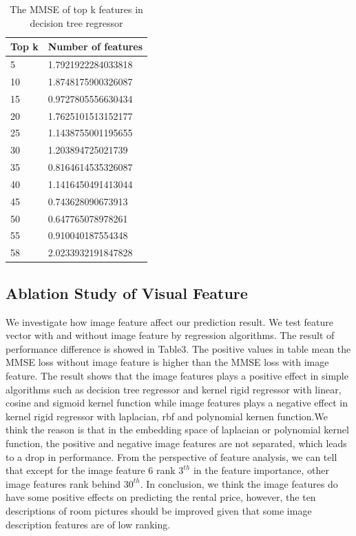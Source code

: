 \documentclass[final]{cvpr}
\begin{document}
\begin{table}[]
\centering
\begin{tabular}{|l|l|}
\hline
Top k & Number of features \\ \hline
5     & 1.7921922284033818 \\ \hline
10    & 1.8748175900326087 \\ \hline
15    & 0.9727805556630434 \\ \hline
20    & 1.7625101513152177 \\ \hline
25    & 1.1438755001195655 \\ \hline
30    & 1.203894725021739  \\ \hline
35    & 0.8164614535326087 \\ \hline
40    & 1.1416450491413044 \\ \hline
45    & 0.743628090673913  \\ \hline
50    & 0.647765078978261  \\ \hline
55    & 0.910040187554348  \\ \hline
58    & 2.0233932191847828 \\ \hline
\end{tabular}
\caption{The MMSE of top k features in decision tree regressor}
\label{tab:my-table21}
\end{table}



\subsection{Ablation Study of Visual Feature}
We investigate how image feature affect our prediction result. We test feature vector with and without image feature by regression algorithms. The result of performance difference is showed in Table3. The positive values in table mean the MMSE loss without image feature is higher than the MMSE loss with image feature. The result shows that the image features plays a positive effect in simple algorithms such as decision tree regressor and kernel rigid regressor with linear, cosine and sigmoid kernel function while image features plays a negative effect in kernel rigid regressor with laplacian, rbf and polynomial kernen function.We think the reason is that in the embedding space of laplacian or polynomial kernel function, the positive and negative image features are not separated, which leads to a drop in performance. From the perspective of feature analysis, we can tell that except for the image feature 6 rank $3^{th}$ in the feature importance, other image features rank behind $30^{th}$. In conclusion, we think the image features do have some positive effects on predicting the rental price, however, the ten descriptions of room pictures should be improved given that some image description features are of low ranking. 
\end{document}

